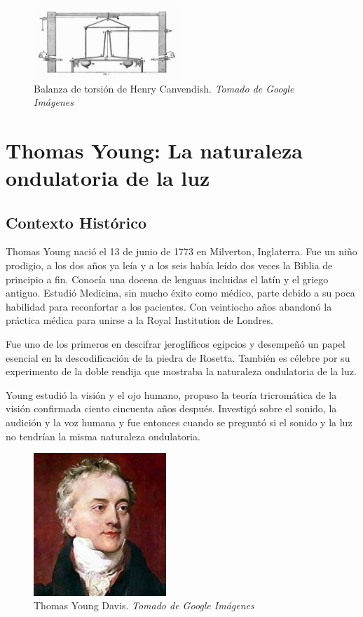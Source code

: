 \documentclass[journal]{IEEEtran}
\begin{document}
\begin{center}
  \begin{figure}[h!]
  \includegraphics[width=55mm]{cavendish2.jpg}
  \caption{Balanza de torsión de Henry Canvendish. \emph{Tomado de Google Imágenes}}
  \end{figure}
\end{center}










\section{Thomas Young: La naturaleza ondulatoria de la luz}

\subsection{Contexto Histórico}
Thomas Young nació el 13 de junio de 1773 en Milverton, Inglaterra. Fue un niño prodigio, a los dos años ya leía y a los seis había leído dos veces la Biblia de principio a fin. Conocía una docena de lenguas incluidas el latín y el griego antiguo. Estudió Medicina, sin mucho éxito como médico, parte debido a su poca habilidad para reconfortar a los pacientes. Con veintiocho años abandonó la práctica médica para unirse a la Royal Institution de Londres. 

Fue uno de los primeros en descifrar jeroglíficos egipcios y desempeñó un papel esencial en la descodificación de la piedra de Rosetta. También es célebre por su experimento de la doble rendija que mostraba la naturaleza ondulatoria de la luz.

Young estudió la visión y el ojo humano, propuso la teoría tricromática de la visión confirmada ciento cincuenta años después. Investigó sobre el sonido, la audición y la voz humana y fue entonces cuando se preguntó si el sonido y la luz no tendrían la misma naturaleza ondulatoria.

\begin{center}
  \begin{figure}[h!]
  \includegraphics[width=50mm]{thomas_young.jpg}
  \caption{Thomas Young Davis. \emph{Tomado de Google Imágenes}}
  \end{figure}
\end{center}
\end{document}
